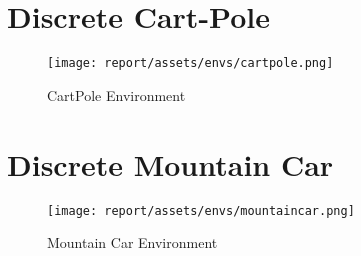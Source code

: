 \section{Discrete Cart-Pole}
\begin{figure}[h!]
    \centering
    \texttt{[image: report/assets/envs/cartpole.png]}
    \caption{CartPole Environment \cite{1606.01540, 6313077}}
    \label{fig:cartpole}
\end{figure}
\cite{1606.01540, 6313077}
\section{Discrete Mountain Car}
\begin{figure}[h!]
    \centering
    \texttt{[image: report/assets/envs/mountaincar.png]}
    \caption{Mountain Car Environment \cite{1606.01540, Moore90efficientmemory-based}}
    \label{fig:cartpole}
\end{figure}
\cite{1606.01540, Moore90efficientmemory-based}